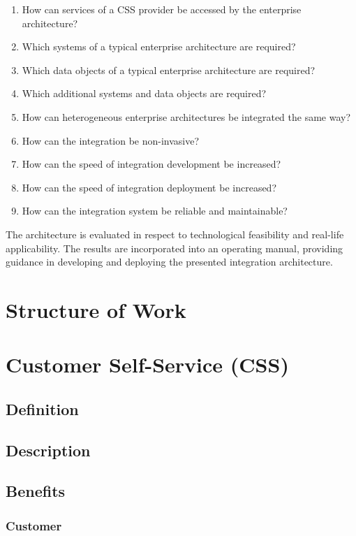 \documentclass[
     12pt,         %
     a4paper,      %
     BCOR10mm,     %
     DIV14,        %
     ]{scrreprt}
\begin{document}
\begin{enumerate}
     \item How can services of a CSS provider be accessed by the enterprise architecture?
     \item Which systems of a typical enterprise architecture are required?
     \item Which data objects of a typical enterprise architecture are required?
     \item Which additional systems and data objects are required?
     \item How can heterogeneous enterprise architectures be integrated the same way?
     \item How can the integration be non-invasive?
     \item How can the speed of integration development be increased?
     \item How can the speed of integration deployment be increased?
     \item How can the integration system be reliable and maintainable?
\end{enumerate}

The architecture is evaluated in respect to technological feasibility and real-life applicability. The results are incorporated into 
an operating manual, providing guidance in developing and deploying the presented integration architecture.

\chapter{Structure of Work}

\chapter{Customer Self-Service (CSS)}

\section{Definition}

\section{Description}

\section{Benefits}

\subsection{Customer}
\end{document}
